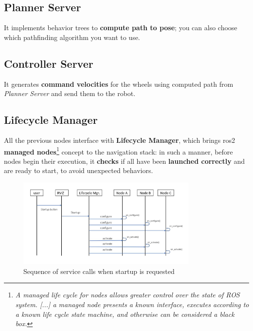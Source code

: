 \subsection{Planner Server}

It implements behavior trees to \textbf{compute path to pose}; you can also choose which pathfinding algorithm you want to use.

\subsection{Controller Server}

It generates \textbf{command velocities} for the wheels using computed path from \textit{Planner Server} and send them to the robot.



\subsection{Lifecycle Manager}

All the previous nodes interface with \textbf{Lifecycle Manager}, which brings \acrshort{ros}2 \textbf{managed nodes}\footnote{\textit{A managed life cycle for nodes allows greater control over the state of ROS system. [...] a managed node presents a known interface, executes according to a known life cycle state machine, and otherwise can be considered a black box.}\cite{lifecycle}} concept to the navigation stack: in such a manner, before nodes begin their execution, it \textbf{checks} if all have been \textbf{launched correctly} and are ready to start, to avoid unexpected behaviors.

\begin{figure}[h]
    \centering
    \includegraphics[width=0.8\textwidth]{images/uml_lifecycle_manager}
    \caption{Sequence of service calls when startup is requested}
\end{figure}

